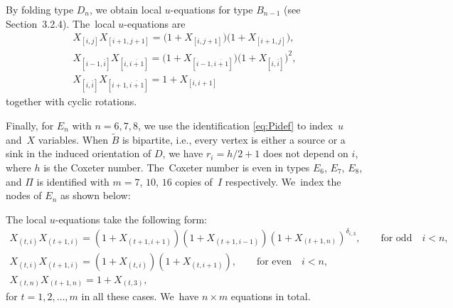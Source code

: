 \documentclass[pdftex]{sigma}%
\def\tB{{\tilde B}}
\def\tB{{\tilde B}}
\numberwithin{equation}{section}
\begin{document}
\medskip{}
By folding type $D_n$, we obtain local $u$-equations for type $B_{n-1}$ (see Section~3.2.4). The~local $u$-equations are
\begin{gather*}
X_{[i,j]} X_{[i{+}1, j{+}1]}=\big(1+X_{[i,j{+}1]}\big)\big(1+X_{[i{+}1, j]}\big),
\\
X_{[i{-}1,\bar i]} X_{[i, \overline{i{+}1}]}=\big(1+X_{[i{-}1, \overline{i{+}1}]}\big)\big(1+X_{[i,\bar i]}\big)^2,
\\
X_{[i,\bar i]} X_{[i+1,\overline{i+1}]}=1+X_{[i, i{+}1]}
\end{gather*}
together with cyclic rotations.

\medskip{}
Finally, for $E_n$ with $n=6,7,8$, we use the identification \eqref{eq:Pidef} to index~$u$ and~$X$ variables. When $\tB$ is bipartite, i.e., every vertex is either a source or a sink in the induced orientation of $D$, we have $r_i = h/2+1$ does not depend on $i$, where $h$ is the Coxeter number. The~Coxeter number is even in types $E_6$, $ E_7$, $E_8$, and $\Pi$ is identified with $m=7$, $10$, $16$ copies of~$I$ respectively. We~index the nodes of $E_n$ as shown below:
\begin{center} 
\end{center}
The local $u$-equations take the following form:
\begin{gather*}
X_{(t,i)}X_{(t+1,i)}=(1+X_{(t+1,i{+}1)})(1+X_{(t+1,i{-}1)})(1+X_{(t+1,n)})^{\delta_{i,3}}, \qquad \text{for~odd}\quad i<n,
\\
X_{(t,i)}X_{(t+1,i)}=(1+X_{(t,i)})(1+X_{(t,i{+}1)}), \qquad \text{for~even}\quad i<n,
\\
 X_{(t,n)}X_{(t+1,n)}=1+X_{(t,3)},
\end{gather*}
for $t=1,2,\dots, m$ in all these cases. We~have $n\times m$ equations in total.
\end{document}
